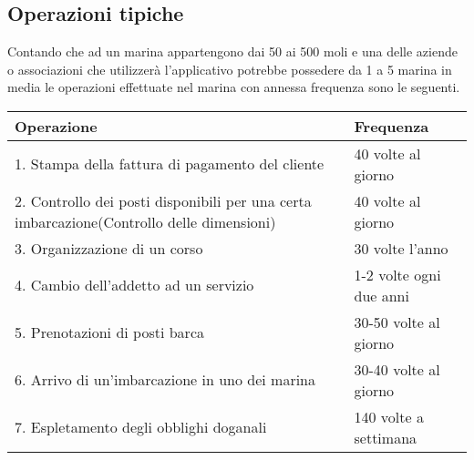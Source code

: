 \subsection{Operazioni tipiche}
Contando che ad un marina appartengono dai 50 ai 500 moli e una delle aziende o associazioni che utilizzerà l'applicativo potrebbe possedere da 1 a 5 marina in media le operazioni effettuate nel marina con annessa frequenza sono le seguenti.
\begin{center}
    \begin{tabularx}{\textwidth}{|p{90mm}|X|}
        \hline
        \rowcolor{gray!30}
        \textbf{Operazione} & \textbf{Frequenza}\\
        \hline
        1. Stampa della fattura di pagamento del cliente & 40 volte al giorno\\
        \hline
        2. Controllo dei posti disponibili per una certa imbarcazione(Controllo delle dimensioni)& 40 volte al giorno\\
        \hline
        3. Organizzazione di un corso & 30 volte l'anno\\
        \hline
        4. Cambio dell'addetto ad un servizio & 1-2 volte ogni due anni\\
        \hline
        5. Prenotazioni di posti barca & 30-50 volte al giorno\\
        \hline
        6. Arrivo di un'imbarcazione in uno dei marina & 30-40 volte al giorno\\
        \hline
        7. Espletamento degli obblighi doganali & 140 volte a settimana\\
        \hline
    \end{tabularx}
\end{center}
